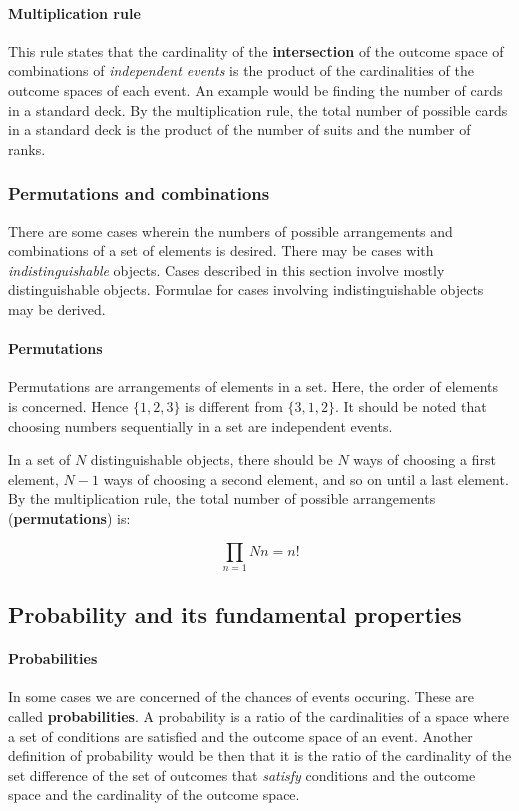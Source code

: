 \paragraph{Multiplication rule}
This rule states that the cardinality of the \textbf{intersection} of the outcome space of combinations of \emph{independent events} is the product of the cardinalities of the outcome spaces of each event.
An example would be finding the number of cards in a standard deck.
By the multiplication rule, the total number of possible cards in a standard deck is the product of the number of suits and the number of ranks.

\subsubsection{Permutations and combinations}
There are some cases wherein the numbers of possible arrangements and combinations of a set of elements is desired.
There may be cases with \textit{indistinguishable} objects.
Cases described in this section involve mostly distinguishable objects.
Formulae for cases involving indistinguishable objects may be derived.

\paragraph{Permutations}
Permutations are arrangements of elements in a set.
Here, the order of elements is concerned.
Hence $\{1, 2, 3\}$ is different from $\{3, 1, 2\}$.
It should be noted that choosing numbers sequentially in a set are independent events.

In a set of $N$ distinguishable objects, there should be $N$ ways of choosing a first element, $N-1$ ways of choosing a second element, and so on until a last element.
By the multiplication rule, the total number of possible arrangements (\textbf{permutations}) is:

$$\prod\limits_{n=1}{N}n = n!$$

\subsection{Probability and its fundamental properties}

\paragraph{Probabilities}
In some cases we are concerned of the chances of events occuring.
These are called \textbf{probabilities}.
A probability is a ratio of the cardinalities of a space where a set of conditions are satisfied and the outcome space of an event.
Another definition of probability would be then that it is the ratio of the cardinality of the set difference of the set of outcomes that \emph{satisfy} conditions and the outcome space and the cardinality of the outcome space.

